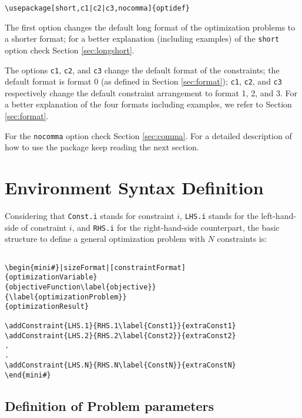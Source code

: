 \documentclass[a4paper]{article}
\begin{document}
\begin{lstlisting}
\usepackage[short,c1|c2|c3,nocomma]{optidef}
\end{lstlisting}

The first option changes the default long format of the optimization problems to a shorter format; for a better explanation (including examples) of the \verb|short| option check Section \ref{sec:longshort}. 

The options \verb|c1|, \verb|c2|, and \verb|c3| change the default format of the constraints; the default format is format 0 (as defined in Section \ref{sec:format}); \verb|c1|, \verb|c2|, and \verb|c3| respectively change the default constraint arrangement to format 1, 2, and 3. For a better explanation of the four formats including examples, we refer to Section \ref{sec:format}.

For the \verb|nocomma| option check Section \ref{sec:comma}. For a detailed description of how to use the package keep reading the next section.

\section{Environment Syntax Definition}
\label{sec:syntax}
Considering that \verb|Const.i| stands for constraint $i$, \verb|LHS.i| stands for the left-hand-side of constraint $i$, and \verb|RHS.i| for the right-hand-side counterpart, the basic structure to define a general optimization problem with $N$ constraints is:
\begin{verbatim}

\begin{mini#}|sizeFormat|[constraintFormat]
{optimizationVariable}
{objectiveFunction\label{objective}}
{\label{optimizationProblem}}  
{optimizationResult}

\addConstraint{LHS.1}{RHS.1\label{Const1}}{extraConst1}
\addConstraint{LHS.2}{RHS.2\label{Const2}}{extraConst2}
.
.
\addConstraint{LHS.N}{RHS.N\label{ConstN}}{extraConstN}
\end{mini#}
\end{verbatim}

\subsection{Definition of Problem parameters}
\end{document}

